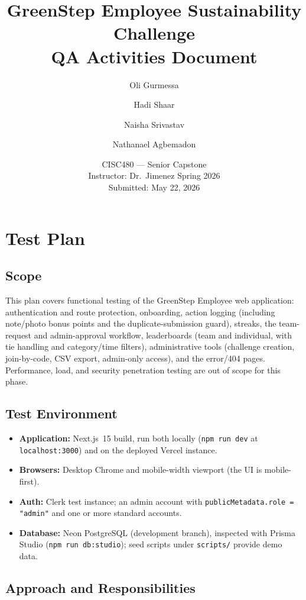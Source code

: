 \documentclass[11pt]{article}
\title{\textbf{GreenStep Employee Sustainability Challenge}\\[0.4em]
\large QA Activities Document}
\author{Oli Gurmessa \and Hadi Shaar \and Naisha Srivastav \and Nathanael Agbemadon}
\date{CISC480 --- Senior Capstone\\[0.3em]
Instructor: Dr.\ Jimenez \quad\textbullet\quad Spring 2026\\[0.3em]
Submitted: May 22, 2026}
\begin{document}
\maketitle
\tableofcontents
\newpage

\section{Test Plan}

\subsection{Scope}

This plan covers functional testing of the GreenStep Employee web application:
authentication and route protection, onboarding, action logging (including
note/photo bonus points and the duplicate-submission guard), streaks, the
team-request and admin-approval workflow, leaderboards (team and individual,
with tie handling and category/time filters), administrative tools (challenge
creation, join-by-code, CSV export, admin-only access), and the error/404
pages. Performance, load, and security penetration testing are out of scope
for this phase.

\subsection{Test Environment}

\begin{itemize}
    \item \textbf{Application:} Next.js~15 build, run both locally
    (\texttt{npm run dev} at \texttt{localhost:3000}) and on the deployed
    Vercel instance.
    \item \textbf{Browsers:} Desktop Chrome and mobile-width viewport (the UI
    is mobile-first).
    \item \textbf{Auth:} Clerk test instance; an admin account with
    \texttt{publicMetadata.role = "admin"} and one or more standard accounts.
    \item \textbf{Database:} Neon PostgreSQL (development branch), inspected
    with Prisma Studio (\texttt{npm run db:studio}); seed scripts under
    \texttt{scripts/} provide demo data.
\end{itemize}

\subsection{Approach and Responsibilities}
\end{document}
